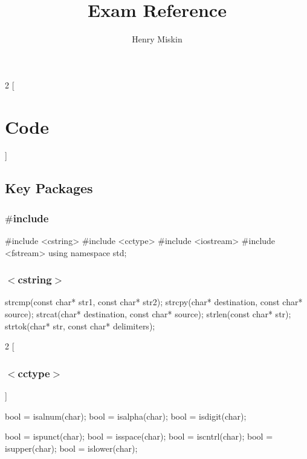 \documentclass[10pt,a4paper]{extarticle}
\begin{document}
\title{Exam Reference}
\author{Henry Miskin}

\fancyhf{}
\renewcommand{\headrulewidth}{0pt}
\cfoot{\thepage}
\rfoot{\today}



\begin{multicols}{2}
[\section*{Code}]
\subsection*{Key Packages}

\subsubsection*{$\#$include}
\begin{cppcode}
  #include <cstring>
  #include <cctype>
  #include <iostream>
  #include <fstream>
  using namespace std;  
\end{cppcode}

\subsubsection*{$<$cstring$>$}
\begin{cppcode}
  strcmp(const char* str1, const char* str2);
  strcpy(char* destination, const char* source);
  strcat(char* destination, const char* source);
  strlen(const char* str);
  strtok(char* str, const char* delimiters);
\end{cppcode}

\begin{multicols}{2}
[\subsubsection*{$<$cctype$>$}]
\begin{cppcode}
  bool = isalnum(char);
  bool = isalpha(char);
  bool = isdigit(char);

  bool = ispunct(char);
  bool = isspace(char);
  bool = iscntrl(char);
  bool = isupper(char);
  bool = islower(char);


\end{cppcode}
\end{multicols}
\end{multicols}
\end{document}

